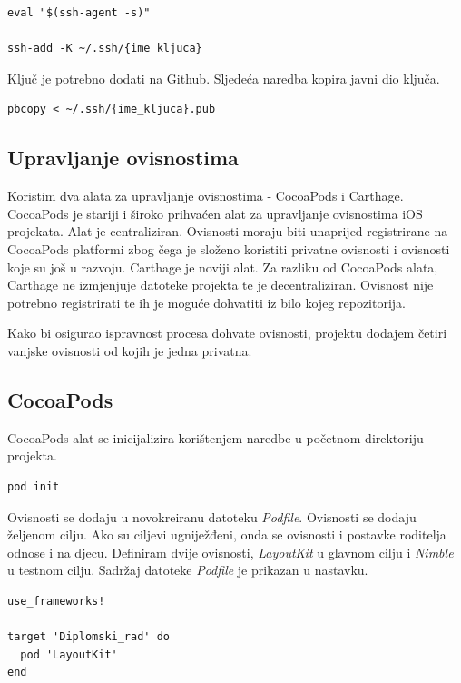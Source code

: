 \documentclass[times, utf8, diplomski, numeric]{fer}
\begin{document}
\begin{appendices}
\begin{verbatim}
eval "$(ssh-agent -s)"

ssh-add -K ~/.ssh/{ime_kljuca}
\end{verbatim}

Ključ je potrebno dodati na Github. Sljedeća naredba kopira javni dio ključa.

\begin{verbatim}
pbcopy < ~/.ssh/{ime_kljuca}.pub
\end{verbatim}


\subsection{Upravljanje ovisnostima}

Koristim dva alata za upravljanje ovisnostima - CocoaPods i Carthage. CocoaPods je stariji i široko prihvaćen alat za upravljanje ovisnostima iOS projekata. Alat je centraliziran. Ovisnosti moraju biti unaprijed registrirane na CocoaPods platformi zbog čega je složeno koristiti privatne ovisnosti i ovisnosti koje su još u razvoju. Carthage je noviji alat. Za razliku od CocoaPods alata, Carthage ne izmjenjuje datoteke projekta te je decentraliziran. Ovisnost nije potrebno registrirati te ih je moguće dohvatiti iz bilo kojeg repozitorija.

Kako bi osigurao ispravnost procesa dohvate ovisnosti, projektu dodajem četiri vanjske ovisnosti od kojih je jedna privatna.

\subsection{CocoaPods}

CocoaPods alat se inicijalizira korištenjem naredbe u početnom direktoriju projekta.

\begin{verbatim}
pod init
\end{verbatim}

Ovisnosti se dodaju u novokreiranu datoteku \textit{Podfile}. Ovisnosti se dodaju željenom cilju. Ako su ciljevi ugniježđeni, onda se ovisnosti i postavke roditelja odnose i na djecu. Definiram dvije ovisnosti, \textit{LayoutKit} u glavnom cilju i \textit{Nimble} u testnom cilju. Sadržaj datoteke \textit{Podfile} je prikazan u nastavku.

\begin{verbatim}
use_frameworks!

target 'Diplomski_rad' do
  pod 'LayoutKit'
end



\end{verbatim}
\end{appendices}
\end{document}
